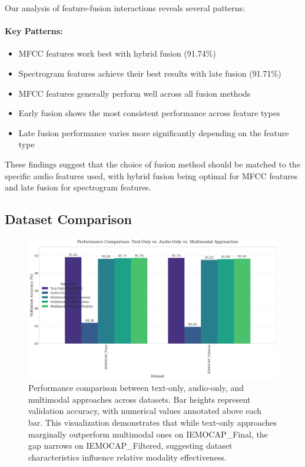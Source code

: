 \documentclass[12pt]{article}
\begin{document}
Our analysis of feature-fusion interactions reveals several patterns:

\paragraph{Key Patterns:}
\begin{itemize}
    \item MFCC features work best with hybrid fusion (91.74\%)
    \item Spectrogram features achieve their best results with late fusion (91.71\%)
    \item MFCC features generally perform well across all fusion methods
    \item Early fusion shows the most consistent performance across feature types
    \item Late fusion performance varies more significantly depending on the feature type
\end{itemize}

These findings suggest that the choice of fusion method should be matched to the specific audio features used, with hybrid fusion being optimal for MFCC features and late fusion for spectrogram features.

\subsection{Dataset Comparison}
\begin{figure}[h]
    \centering
    \includegraphics[width=0.95\linewidth]{Figures/modality_comparison_chart.png}
    \caption{Performance comparison between text-only, audio-only, and multimodal approaches across datasets. Bar heights represent validation accuracy, with numerical values annotated above each bar. This visualization demonstrates that while text-only approaches marginally outperform multimodal ones on IEMOCAP\_Final, the gap narrows on IEMOCAP\_Filtered, suggesting dataset characteristics influence relative modality effectiveness.}
    \label{fig:modality_comparison}
\end{figure}
\end{document}
